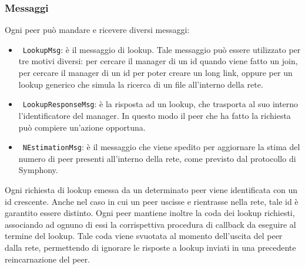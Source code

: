 \documentclass[prodmode,acmtap]{acmlarge}
\begin{document}

\subsubsection*{Messaggi}

Ogni peer può mandare e ricevere diversi messaggi:
\begin{itemize}
	\item ~\texttt{LookupMsg}: è il messaggio di lookup. Tale messaggio può essere utilizzato per tre motivi diversi: per cercare il manager di un id quando viene fatto un join, per cercare il manager di un id per poter creare un long link, oppure per un lookup generico che simula la ricerca di un file all'interno della rete.
	\item ~\texttt{LookupResponseMsg}: è la risposta ad un lookup, che trasporta al suo interno l'identificatore del manager. In questo modo il peer che ha fatto la richiesta può compiere un'azione opportuna.
	\item ~\texttt{NEstimationMsg}: è il messaggio che viene spedito per aggiornare la stima del numero di peer presenti all'interno della rete, come previsto dal protocollo di Symphony.
\end{itemize}

Ogni richiesta di lookup emessa da un determinato peer viene identificata con un id crescente. Anche nel caso in cui un peer uscisse e rientrasse nella rete, tale id è garantito essere distinto.
Ogni peer mantiene inoltre la coda dei lookup richiesti, associando ad ognuno di essi la corrispettiva procedura di callback da eseguire al termine del lookup.
Tale coda viene svuotata al momento dell'uscita del peer dalla rete, permettendo di ignorare le risposte a lookup inviati in una precedente reincarnazione del peer.
\end{document}
